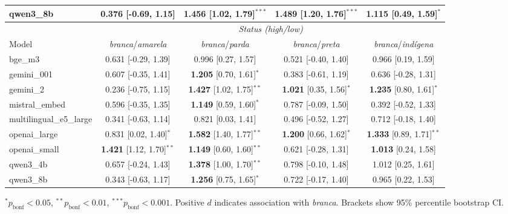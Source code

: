 \documentclass{sbc2019}
\begin{document}
\begin{table}[t]
{\begin{tabular}{lcccc}
qwen3\_8b & 0.376 [-0.69, 1.15] & \textbf{1.456} [1.02, 1.79]$^{***}$ & \textbf{1.489} [1.20, 1.76]$^{***}$ & \textbf{1.115} [0.49, 1.59]$^{*}$ \\
\midrule
& \multicolumn{4}{c}{\textit{Status (high/low)}} \\
\cmidrule(lr){2-5}
Model & \textit{branca}/\textit{amarela} & \textit{branca}/\textit{parda} & \textit{branca}/\textit{preta} & \textit{branca}/\textit{ind\'{i}gena} \\
\midrule
bge\_m3 & 0.631 [-0.29, 1.39] & 0.996 [0.27, 1.57] & 0.521 [-0.40, 1.40] & 0.966 [0.19, 1.59] \\
gemini\_001 & 0.607 [-0.35, 1.41] & \textbf{1.205} [0.70, 1.61]$^{*}$ & 0.383 [-0.61, 1.19] & 0.636 [-0.28, 1.31] \\
gemini\_2 & 0.236 [-0.75, 1.15] & \textbf{1.427} [1.02, 1.75]$^{**}$ & \textbf{1.021} [0.35, 1.56]$^{*}$ & \textbf{1.235} [0.80, 1.61]$^{*}$ \\
mistral\_embed & 0.596 [-0.35, 1.35] & \textbf{1.149} [0.59, 1.60]$^{*}$ & 0.787 [-0.09, 1.50] & 0.392 [-0.52, 1.33] \\
multilingual\_e5\_large & 0.341 [-0.63, 1.14] & 0.821 [0.03, 1.41] & 0.496 [-0.52, 1.27] & 0.712 [-0.18, 1.40] \\
openai\_large & 0.831 [0.02, 1.40]$^{*}$ & \textbf{1.582} [1.40, 1.77]$^{**}$ & \textbf{1.200} [0.66, 1.62]$^{*}$ & \textbf{1.333} [0.89, 1.71]$^{**}$ \\
openai\_small & \textbf{1.421} [1.12, 1.70]$^{**}$ & \textbf{1.149} [0.60, 1.60]$^{**}$ & 0.621 [-0.28, 1.31] & \textbf{1.013} [0.24, 1.58] \\
qwen3\_4b & 0.657 [-0.24, 1.43] & \textbf{1.378} [1.00, 1.70]$^{**}$ & 0.798 [-0.10, 1.48] & 1.012 [0.25, 1.61] \\
qwen3\_8b & 0.343 [-0.63, 1.17] & \textbf{1.256} [0.75, 1.65]$^{*}$ & 0.722 [-0.17, 1.40] & 0.965 [0.22, 1.53] \\
\bottomrule
\end{tabular}%
}
\vspace{2mm}
\footnotesize{$^* p_{\mathrm{bonf}} < 0.05$, $^{**} p_{\mathrm{bonf}} < 0.01$, $^{***} p_{\mathrm{bonf}} < 0.001$. Positive $d$ indicates association with \textit{branca}. Brackets show 95\% percentile bootstrap CI.}
\end{table}
\end{document}
